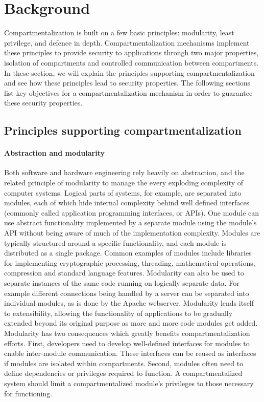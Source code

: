 \section{Background}
\label{sec:seccells:background}

Compartmentalization is built on a few basic principles:
modularity, least privilege, and defence in depth.
Compartmentalization mechanisms implement these principles to provide security
to applications through two major properties, isolation of compartments
and controlled communication between compartments.
In these section, we will explain the principles supporting 
compartmentalization and see how these principles lead to security
properties.
The following sections list key objectives for a compartmentalization
mechanism in order to guarantee these security properties.

\subsection{Principles supporting compartmentalization}
\label{sec:seccells:background:principles}

\paragraph{Abstraction and modularity}
Both software and hardware engineering rely heavily on abstraction, and the
related principle of modularity to manage the every exploding complexity of
computer systems.
Logical parts of systems, for example, are separated into modules, each of 
which hide internal complexity behind well defined interfaces
(commonly called application programming interfaces, or APIs).
One module can use abstract functionality implemented by a separate module
using the module's API without being aware of much of the implementation
complexity.
Modules are typically structured around a specific functionality, and
each module is distributed as a single package.
Common examples of modules include libraries for implementing
cryptographic processing, threading, mathematical operations, compression
and standard language features.
Modularity can also be used to separate instances of the same code running on
logically separate data. 
For example different connections being handled by a server can be separated
into individual modules, as is done by the Apache webserver.
Modularity lends itself to extensibility, allowing the functionality of
applications to be gradually extended beyond its original purpose as more and
more code modules get added.
Modularity has two consequences which greatly benefits compartmentalization
efforts.
First, developers need to develop well-defined interfaces for modules to
enable inter-module communication.
These interfaces can be reused as interfaces if modules are isolated within
compartments.
Second, modules often need to define dependencies or privileges required to 
function.
A compartmentalized system should limit a compartmentalized module's privileges
to those necessary for functioning.

